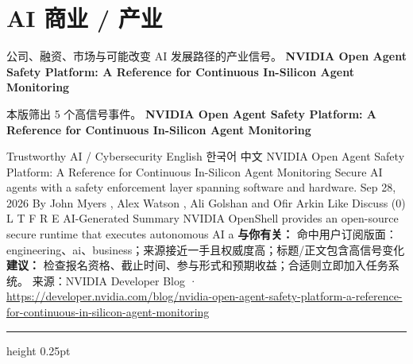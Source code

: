 \documentclass[10.5pt]{ctexart}
\begin{document}
\section*{AI 商业 / 产业}
{\color{ormuted} 公司、融资、市场与可能改变 AI 发展路径的产业信号。}
\vspace{2mm}
{\LARGE\bfseries NVIDIA Open Agent Safety Platform: A Reference for Continuous In-Silicon Agent Monitoring}\par
\vspace{1mm}
{\color{ormuted} 本版筛出 5 个高信号事件。}
\vspace{3mm}
{\Large\bfseries NVIDIA Open Agent Safety Platform: A Reference for Continuous In-Silicon Agent Monitoring}\par
Trustworthy AI / Cybersecurity English 한국어 中文 NVIDIA Open Agent Safety Platform: A Reference for Continuous In-Silicon Agent Monitoring Secure AI agents with a safety enforcement layer spanning software and hardware. Sep 28, 2026 By John Myers , Alex Watson , Ali Golshan and Ofir Arkin Like Discuss (0) L T F R E AI-Generated Summary NVIDIA OpenShell provides an open-source secure runtime that executes autonomous AI a
\textbf{与你有关：} 命中用户订阅版面：engineering、ai、business；来源接近一手且权威度高；标题/正文包含高信号变化
\textbf{建议：} 检查报名资格、截止时间、参与形式和预期收益；合适则立即加入任务系统。
{\footnotesize\color{ormuted} 来源：NVIDIA Developer Blog · \url{https://developer.nvidia.com/blog/nvidia-open-agent-safety-platform-a-reference-for-continuous-in-silicon-agent-monitoring}}
\vspace{4mm}
\hrule height 0.25pt
\vspace{3mm}
\end{document}
